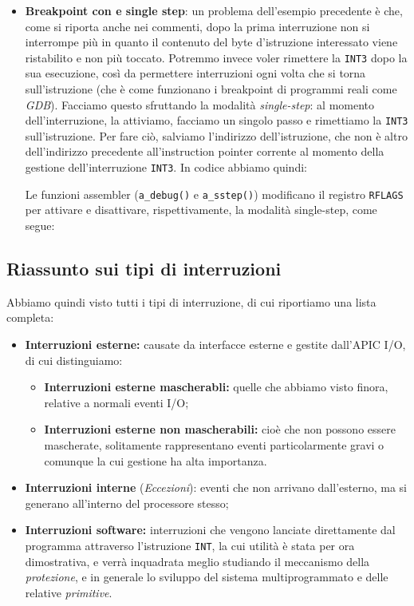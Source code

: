 \documentclass[a4paper,11pt]{article}
\begin{document}
\begin{itemize}
	\item \textbf{Breakpoint con  e single step}: un problema dell'esempio precedente è che, come si riporta anche nei commenti, dopo la prima interruzione non si interrompe più in quanto il contenuto del byte d'istruzione interessato viene ristabilito e non più toccato.
Potremmo invece voler rimettere la \lstinline|INT3| dopo la sua esecuzione, così da permettere interruzioni ogni volta che si torna sull'istruzione (che è come funzionano i breakpoint di programmi reali come \textit{GDB}).
Facciamo questo sfruttando la modalità \textit{single-step}: al momento dell'interruzione, la attiviamo, facciamo un singolo passo e rimettiamo la \lstinline|INT3| sull'istruzione.
Per fare ciò, salviamo l'indirizzo dell'istruzione, che non è altro dell'indirizzo precedente all'instruction pointer corrente al momento della gestione dell'interruzione \lstinline|INT3|.
In codice abbiamo quindi:
\lstset{style=codestyle, language=c++}

Le funzioni assembler (\lstinline|a_debug()| e \lstinline|a_sstep()|) modificano il registro \lstinline|RFLAGS| per attivare e disattivare, rispettivamente, la modalità single-step, come segue: 
\lstset{style=codestyle, language=assembler}


\end{itemize}

\subsection{Riassunto sui tipi di interruzioni}
Abbiamo quindi visto tutti i tipi di interruzione, di cui riportiamo una lista completa:
\begin{itemize}
	\item \textbf{Interruzioni esterne:} causate da interfacce esterne e gestite dall'APIC I/O, di cui distinguiamo:
		\begin{itemize}
			\item \textbf{Interruzioni esterne mascherabli:} quelle che abbiamo visto finora, relative a normali eventi I/O;
			\item \textbf{Interruzioni esterne non mascherabili:} cioè che non possono essere mascherate, solitamente rappresentano eventi particolarmente gravi o comunque la cui gestione ha alta importanza.
		\end{itemize}
	\item \textbf{Interruzioni interne} (\textit{Eccezioni}): eventi che non arrivano dall'esterno, ma si generano all'interno del processore stesso;
	\item \textbf{Interruzioni software:} interruzioni che vengono lanciate direttamente dal programma attraverso l'istruzione \lstinline|INT|, la cui utilità è stata per ora dimostrativa, e verrà inquadrata meglio studiando il meccanismo della \textit{protezione}, e in generale lo sviluppo del sistema multiprogrammato e delle relative \textit{primitive}.
\end{itemize}
\end{document}
